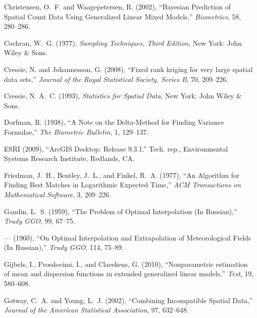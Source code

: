 \documentclass[12pt, titlepage]{article}\usepackage[]{graphicx}\usepackage[]{color}
\begin{document}
\begin{thebibliography}{47}
Christensen, O.~F. and Waagepetersen, R. (2002), \enquote{Bayesian Prediction
  of Spatial Count Data Using Generalized Linear Mixed Models,}
  \textit{Biometrics}, 58, 280--286.

Cochran, W.~G. (1977), \textit{Sampling Techniques, Third Edition}, New York:
  John Wiley \& Sons.

Cressie, N. and Johannesson, G. (2008), \enquote{Fixed rank kriging for very
  large spatial data sets,} \textit{Journal of the Royal Statistical Society,
  Series B}, 70, 209--226.

Cressie, N. A.~C. (1993), \textit{Statistics for Spatial Data}, New York: John
  Wiley \& Sons.

Dorfman, R. (1938), \enquote{A Note on the Delta-Method for Finding Variance
  Formulae,} \textit{The Biometric Bulletin}, 1, 129--137.

ESRI (2009), \enquote{ArcGIS Desktop: Release 9.3.1.} Tech. rep., Environmental
  Systems Research Institute, Redlands, CA.

Friedman, J.~H., Bentley, J.~L., and Finkel, R.~A. (1977), \enquote{An
  Algorithm for Finding Best Matches in Logarithmic Expected Time,} \textit{ACM
  Transactions on Mathematical Software}, 3, 209--226.

Gandin, L.~S. (1959), \enquote{The Problem of Optimal Interpolation (In
  Russian),} \textit{Trudy GGO}, 99, 67--75.

--- (1960), \enquote{On Optimal Interpolation and Extrapolation of
  Meteorological Fields (In Russian),} \textit{Trudy GGO}, 114, 75--89.

Gijbels, I., Prosdocimi, I., and Claeskens, G. (2010), \enquote{Nonparametric
  estimation of mean and dispersion functions in extended generalized linear
  models,} \textit{Test}, 19, 580--608.

Gotway, C.~A. and Young, L.~J. (2002), \enquote{Combining Incompatible Spatial
  Data,} \textit{Journal of the American Statistical Association}, 97,
  632--648.


\end{thebibliography}
\end{document}
